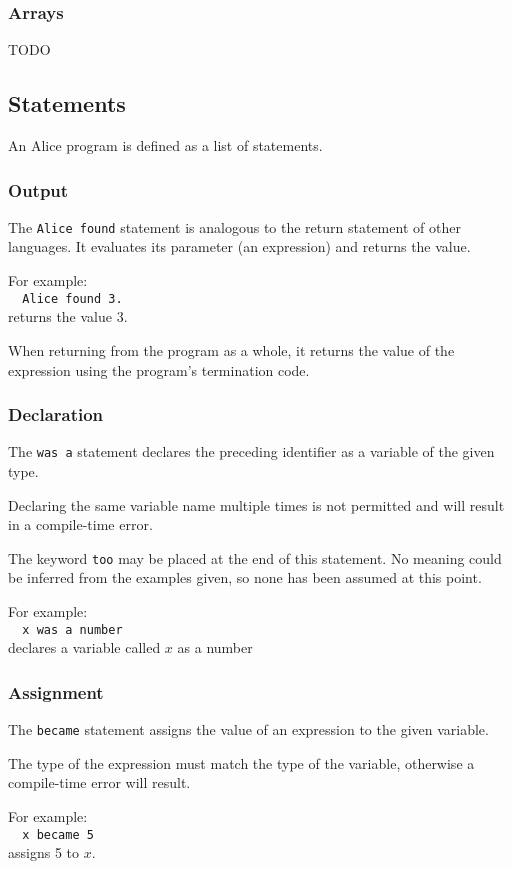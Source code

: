 \documentclass[a4paper,11pt]{article}
\begin{document}
\subsubsection{Arrays}
TODO

\subsection{Statements}
An Alice program is defined as a list of statements.

\subsubsection{Output}
The \verb:Alice found: statement is analogous to the return statement of
other languages. It evaluates its parameter (an expression) and returns the
value.

For example:\\
\verb:  Alice found 3.:\\
returns the value 3.

When returning from the program as a whole, it returns the value of the expression
using the program's termination code.

\subsubsection{Declaration}
The \verb:was a: statement declares the preceding identifier as a variable of
the given type.

Declaring the same variable name multiple times is not permitted and will
result in a compile-time error.

The keyword \verb:too: may be placed at the end of this statement. No meaning
could be inferred from the examples given, so none has been assumed at this point.

For example:\\
\verb:  x was a number:\\
declares a variable called $x$ as a number

\subsubsection{Assignment}
The \verb:became: statement assigns the value of an expression to the given
variable.

The type of the expression must match the type of the variable, otherwise a
compile-time error will result.

For example:\\
\verb:  x became 5:\\
assigns 5 to $x$.
\end{document}
